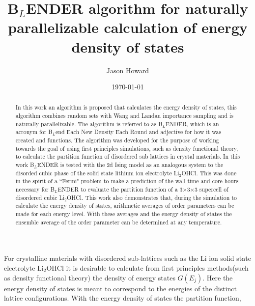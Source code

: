 \documentclass[aps,prl,reprint,superscriptaddress,showkeys]{revtex4-1}
\begin{document}
\title{B$_L$ENDER algorithm for naturally parallelizable calculation of energy density of states}

\author{Jason Howard}

\date{\today}

%


\begin{acknowledgments}
\end{acknowledgments}
\begin{abstract}
In this work  an algorithm is proposed that calculates the energy density of states, this algorithm combines random sets with Wang and Landau importance sampling  and is naturally parallelizable. The algorithm is referred to as B$_L$ENDER, which is an acronym for B$_L$end Each New Density Each Round and  adjective for  how it was created and functions. The algorithm was developed for the purpose of working towards the goal of using first principles simulations, such as density functional theory, to calculate the partition function of disordered sub lattices in crystal materials. In this work  B$_L$ENDER  is tested with the 2d Ising model as an analogous system to the disorded cubic phase of the solid state lithium ion electrolyte Li$_2$OHCl. This was done in the spirit of a ``Fermi" problem to make a prediction of the  wall time and core hours necessary for B$_L$ENDER to evaluate the partition function of a 3$\times$3$\times$3 supercell of disordered cubic Li$_2$OHCl. This work also demonstrates that, during the simulation to calculate the energy density of states, arithmetic averages of  order parameters can be made for each energy level. With these averages and the energy density of states the ensemble average of the order parameter can be determined at any temperature. 
\end{abstract}
\maketitle
For crystalline  materials  with disordered sub-lattices such as the Li ion solid state electrolyte  Li$_2$OHCl\cite{Hood, Goodenough, Schwering, Holzwarth_group, Song_Borodin} it is desirable to calculate from first principles methods(such as density functional theory\cite{kohn:1965}) the density of energy states $G(E_j)$. Here the energy density of states is meant to correspond to the energies of the distinct lattice configurations. With the energy density of states the partition function,
\end{document}
